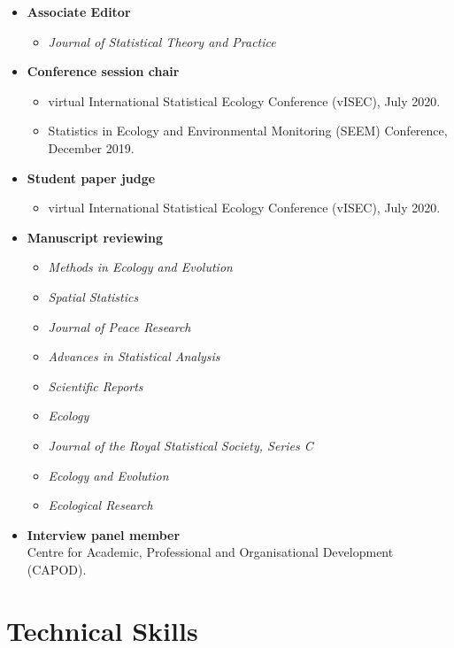\documentclass[10pt,a4paper]{moderncv}
\begin{document}
\begin{itemize}
\item \textbf{Associate Editor}
  \begin{itemize}
  \item \textit{Journal of Statistical Theory and Practice}
  \end{itemize}
\item \textbf{Conference session chair}
  \begin{itemize}
  \item virtual International Statistical Ecology Conference (vISEC), July 2020.
  \item Statistics in Ecology and Environmental Monitoring (SEEM) Conference, December 2019.
  \end{itemize}
  \item \textbf{Student paper judge}
  \begin{itemize}
  \item virtual International Statistical Ecology Conference (vISEC), July 2020.
  \end{itemize}
\item \textbf{Manuscript reviewing}
  \begin{itemize}
  \item \textit{Methods in Ecology and Evolution}
  \item \textit{Spatial Statistics}
  \item \textit{Journal of Peace Research}
  \item \textit{Advances in Statistical Analysis}
  \item   \textit{Scientific Reports}
  \item \textit{Ecology}
  \item  \textit{Journal of the Royal Statistical Society, Series C}
  \item   \textit{Ecology and Evolution}
  \item   \textit{Ecological Research}
  \end{itemize}
  \item \textbf{Interview panel member}\\
    Centre for Academic, Professional and Organisational Development (CAPOD).
  \end{itemize}


\section{Technical Skills}
\end{document}
